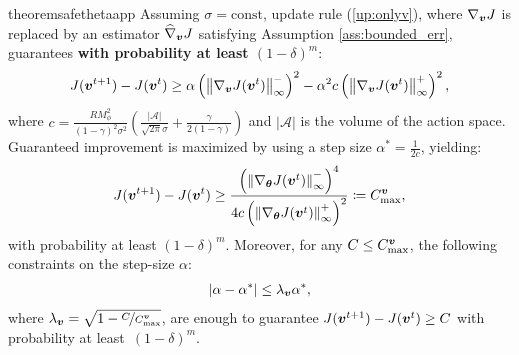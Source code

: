 \begin{restatable}{theorem}{safethetaapp}\label{th:safethetaapp}
	Assuming $\sigma = \text{const}$, update rule (\ref{up:onlyv}), where $\nabla_{\vv}J$ is replaced by an estimator $\widehat{\nabla}_{\vv}J$ satisfying Assumption \ref{ass:bounded_err}, guarantees \textbf{with probability at least $(1-\delta)^m$}:
	\begin{align}
	J(\vv^{t+1}) - J(\vv^t) \geq \alpha\left(\norm[\infty]{\gradJ[\vv]{\vv^t}}^-\right)^2 - 
	\alpha^2 c \left(\norm[\infty]{\gradJ[\vv]{\vv^t}}^+\right)^2,
	\end{align}
	where $c = \frac{RM_{\phi}^2}{(1-\gamma)^2\sigma^2}\left(\frac{|\mathcal{A}|}{\sqrt{2\pi}\sigma} +	\frac{\gamma}{2(1-\gamma)}\right)$ and  $|\mathcal{A}|$ is the volume of the action space. Guaranteed improvement is maximized by using a step size $\alpha^* = \frac{1}{2c}$, yielding:
	\begin{align}
	J(\vv^{t+1}) - J(\vv^t) \geq \frac{\left(\norm[\infty]{\gradJ{\vv^t}}^-\right)^4}{4c\left(\norm[\infty]{\gradJ{\vv^t}}^+\right)^2}
	\coloneqq C_{\text{max}}^{\vv},
	\end{align}
	with probability at least $(1-\delta)^m$. Moreover, for any $C\leq C_{\text{max}}^{\vv}$, the following constraints on the step-size $\alpha$:
	\begin{align}
	|\alpha - \alpha^*| \leq \lambda_{\vv}\alpha^*, 
	\end{align}
	where $\lambda_{\vv}=\sqrt{1 - \nicefrac{C}{C_{\text{max}}^{\vv}}}$, are enough to guarantee $J(\vv^{t+1}) - J(\vv^t)\geq C$ with probability at least~${(1-\delta)^m}$.
\end{restatable}

